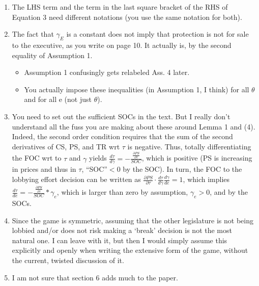 \documentclass[12pt]{article}
\begin{document}
\begin{enumerate}
	\item The LHS term and the term in the last square bracket of the RHS of Equation 3 need different notations (you use the same notation for both).
	\item The fact that $\gamma_E$ is a constant does not imply that protection is not for sale to the executive, as you write on page 10. It actually is, by the second equality of Assumption 1.
		\begin{itemize}
			\item Assumption 1 confusingly gets relabeled Ass. 4 later.
			\item You actually impose these inequalities (in Assumption 1, I think) for all $\theta$ and for all e (not just $\theta$).
		\end{itemize}
	\item You need to set out the sufficient SOCs in the text. But I really don’t understand all the fuss you are making about these around Lemma 1 and (4). Indeed, the second order condition requires that the sum of the second derivatives of CS, PS, and TR wrt $\tau$ is negative. Thus, totally differentiating the FOC wrt to $\tau$ and $\gamma$ yields $\frac{d\tau}{d\gamma} = - \frac{\frac{\partial PS}{\partial\tau}}{SOC}$, which is positive (PS is increasing in prices and thus in $\tau$, “SOC”$<0$ by the SOC). In turn, the FOC to the lobbying effort decision can be written as $\frac{\partial PS}{\partial\tau} \cdot \frac{d\tau}{d\gamma} \frac{ d\gamma}{de} = 1$, which implies $\frac{d\tau}{d e} = - \frac{\frac{\partial PS}{ \partial\tau}}{ SOC} * \gamma_e$, which is larger than zero by assumption, $\gamma_e>0$, and by the SOCs.
	\addtocounter{enumi}{1}
	\item Since the game is symmetric, assuming that the other legislature is not being lobbied and/or does not risk making a ‘break’ decision is not the most natural one. I can leave with it, but then I would simply assume this explicitly and openly when writing the extensive form of the game, without the current, twisted discussion of it.
	\item I am not sure that section 6 adds much to the paper.
\end{enumerate}
\end{document}
